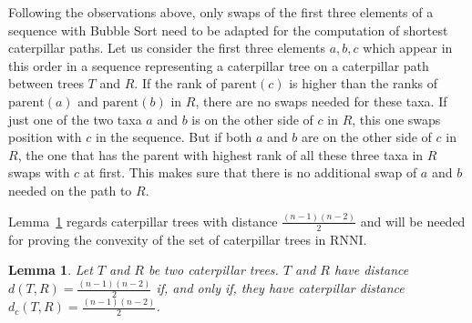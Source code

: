 \documentclass{amsart}
\newcommand{\parent}{\mathrm{parent}}
\newcommand{\rnni}{\mathrm{RNNI}}
\newtheorem{lemma}[definition]{Lemma}
\begin{document}
Following the observations above, only swaps of the first three elements of a sequence with Bubble Sort need to be adapted for the computation of shortest caterpillar paths.
Let us consider the first three elements $a,b,c$ which appear in this order in a sequence representing a caterpillar tree on a caterpillar path between trees $T$ and $R$.
If the rank of $\parent(c)$ is higher than the ranks of $\parent(a)$ and $\parent(b)$ in $R$, there are no swaps needed for these taxa.
If just one of the two taxa $a$ and $b$ is on the other side of $c$ in $R$, this one swaps position with $c$ in the sequence.
But if both $a$ and $b$ are on the other side of $c$ in $R$, the one that has the parent with highest rank of all these three taxa in $R$ swaps with $c$ at first.
This makes sure that there is no additional swap of $a$ and $b$ needed on the path to $R$.

Lemma~\ref{lemma:caterpillar_dist=diameter} regards caterpillar trees with distance $\frac{(n-1)(n-2)}{2}$ and will be needed for proving the convexity of the set of caterpillar trees in $\rnni$.

\begin{lemma}
    Let $T$ and $R$ be two caterpillar trees.
    $T$ and $R$ have distance $d(T,R) = \frac{(n-1)(n-2)}{2}$ if, and only if, they have caterpillar distance $d_c(T,R) = \frac{(n-1)(n-2)}{2}$.
    \label{lemma:caterpillar_dist=diameter}
\end{lemma}
\end{document}
